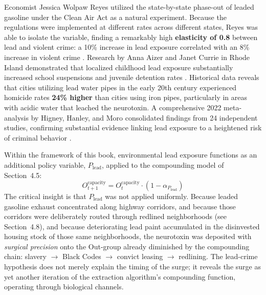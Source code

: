 \documentclass[12pt,openany]{book}
\begin{document}
Economist Jessica Wolpaw Reyes utilized the state-by-state phase-out of leaded gasoline under the Clean Air Act as a natural experiment. Because the regulations were implemented at different rates across different states, Reyes was able to isolate the variable, finding a remarkably high \textbf{elasticity of 0.8} between lead and violent crime: a 10\% increase in lead exposure correlated with an 8\% increase in violent crime \cite{reyes2007}. Research by Anna Aizer and Janet Currie in Rhode Island demonstrated that localized childhood lead exposure substantially increased school suspensions and juvenile detention rates \cite{aizer_currie}. Historical data reveals that cities utilizing lead water pipes in the early 20th century experienced homicide rates \textbf{24\% higher} than cities using iron pipes, particularly in areas with acidic water that leached the neurotoxin. A comprehensive 2022 meta-analysis by Higney, Hanley, and Moro consolidated findings from 24 independent studies, confirming substantial evidence linking lead exposure to a heightened risk of criminal behavior \cite{higney2022}.

Within the framework of this book, environmental lead exposure functions as an additional policy variable, $P_{\text{lead}}$, applied to the compounding model of Section~4.5:
\[
O_{t+1}^{\text{capacity}} = O_t^{\text{capacity}} \cdot (1 - \alpha_{P_{\text{lead}}})
\]
The critical insight is that $P_{\text{lead}}$ was not applied uniformly. Because leaded gasoline exhaust concentrated along highway corridors, and because those corridors were deliberately routed through redlined neighborhoods (see Section~4.8), and because deteriorating lead paint accumulated in the disinvested housing stock of those same neighborhoods, the neurotoxin was deposited with \textit{surgical precision} onto the Out-group already diminished by the compounding chain: slavery $\rightarrow$ Black Codes $\rightarrow$ convict leasing $\rightarrow$ redlining. The lead-crime hypothesis does not merely explain the timing of the surge; it reveals the surge as yet another iteration of the extraction algorithm's compounding function, operating through biological channels.
\end{document}
